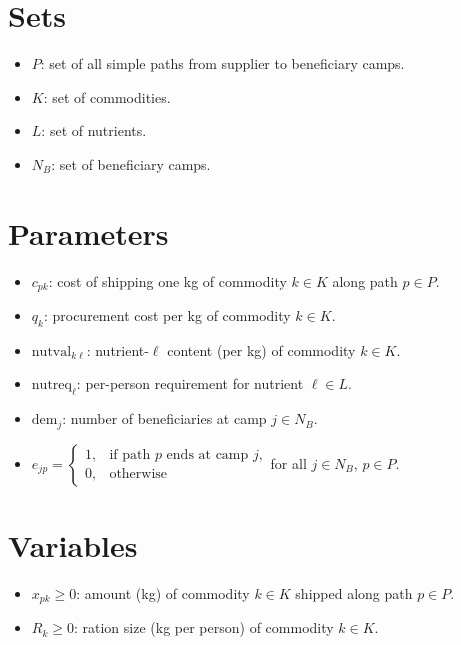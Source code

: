 \documentclass{article}
\begin{document}
\section{Sets}
\begin{itemize}[leftmargin=*,nosep]
    \item $P$: set of all simple paths from supplier to beneficiary camps.
    \item $K$: set of commodities.
    \item $L$: set of nutrients.
    \item $N_B$: set of beneficiary camps.
\end{itemize}

\section{Parameters}
\begin{itemize}[leftmargin=*,nosep]
    \item $c_{pk}$: cost of shipping one kg of commodity $k \in K$ along path $p \in P$.
    \item $q_k$: procurement cost per kg of commodity $k \in K$.
    \item $\mathrm{nutval}_{k\ell}$: nutrient-$\ell$ content (per kg) of commodity $k \in K$.
    \item $\mathrm{nutreq}_\ell$: per-person requirement for nutrient $\ell \in L$.
    \item $\mathrm{dem}_j$: number of beneficiaries at camp $j \in N_B$.
    \item $e_{jp} = 
    \begin{cases}
        1, & \text{if path } p \text{ ends at camp } j, \\
        0, & \text{otherwise}
    \end{cases}$\quad for all $j \in N_B$, $p \in P$.
\end{itemize}

\section{Variables}
\begin{itemize}[leftmargin=*,nosep]
    \item $x_{pk} \geq 0$: amount (kg) of commodity $k \in K$ shipped along path $p \in P$.
    \item $R_k \geq 0$: ration size (kg per person) of commodity $k \in K$.
\end{itemize}
\end{document}
